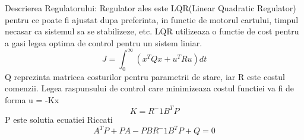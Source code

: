 \documentclass[12pt]{article}
\begin{document}
Descrierea Regulatorului:\newline \newline
Regulator ales este LQR(Linear Quadratic Regulator) pentru ce poate fi ajustat dupa preferinta, in functie de motorul cartului, timpul necasar ca sistemul sa se stabilizeze, etc. LQR utilizeaza o functie de cost pentru a gasi legea optima de control pentru un sistem liniar.  $$ J = \int_ {0}^{\infty}(x^TQx+u^TRu) dt $$ Q reprezinta matricea costurilor pentru parametrii de stare,  iar R este costul comenzii. 
Legea raspunsului de control care minimizeaza costul functiei va fi de forma u = -Kx $$K = R^-1 B^T P$$
P este solutia  ecuatiei Riccati $$A^TP+PA-PBR^-1B^TP+Q=0$$
	
\end{document}
